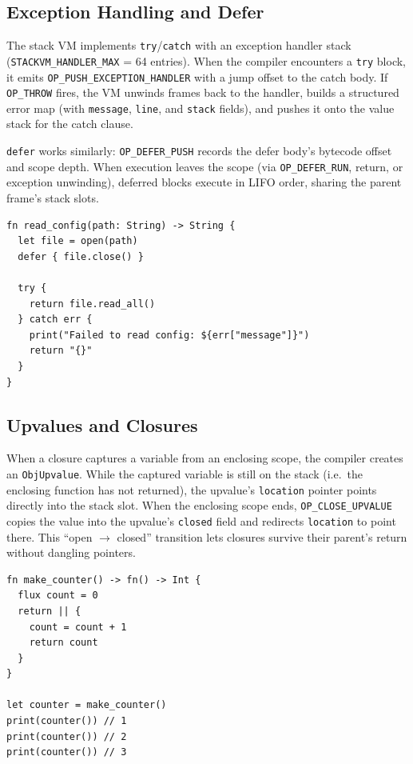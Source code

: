 \subsection{Exception Handling and Defer}

The stack VM implements \lstinline|try|/\lstinline|catch| with an exception
handler stack (\lstinline|STACKVM_HANDLER_MAX| = 64 entries). When the compiler
encounters a \lstinline|try| block, it emits
\lstinline|OP_PUSH_EXCEPTION_HANDLER| with a jump offset to the catch body.
If \lstinline|OP_THROW| fires, the VM unwinds frames back to the handler,
builds a structured error map (with \lstinline|message|, \lstinline|line|, and
\lstinline|stack| fields), and pushes it onto the value stack for the catch
clause.

\lstinline|defer| works similarly: \lstinline|OP_DEFER_PUSH| records the defer
body's bytecode offset and scope depth. When execution leaves the scope (via
\lstinline|OP_DEFER_RUN|, return, or exception unwinding), deferred blocks
execute in LIFO order, sharing the parent frame's stack slots.

\begin{lstlisting}[language=Lattice, caption={Exception handling and defer in action}]
fn read_config(path: String) -> String {
  let file = open(path)
  defer { file.close() }

  try {
    return file.read_all()
  } catch err {
    print("Failed to read config: ${err["message"]}")
    return "{}"
  }
}
\end{lstlisting}

\subsection{Upvalues and Closures}

When a closure captures a variable from an enclosing scope, the compiler
creates an \lstinline|ObjUpvalue|. While the captured variable is still on the
stack (i.e.\ the enclosing function has not returned), the upvalue's
\lstinline|location| pointer points directly into the stack slot. When the
enclosing scope ends, \lstinline|OP_CLOSE_UPVALUE| copies the value into the
upvalue's \lstinline|closed| field and redirects \lstinline|location| to point
there. This ``open $\to$ closed'' transition lets closures survive their
parent's return without dangling pointers.

\begin{lstlisting}[language=Lattice, caption={Closures capture variables via upvalues}]
fn make_counter() -> fn() -> Int {
  flux count = 0
  return || {
    count = count + 1
    return count
  }
}

let counter = make_counter()
print(counter()) // 1
print(counter()) // 2
print(counter()) // 3
\end{lstlisting}


